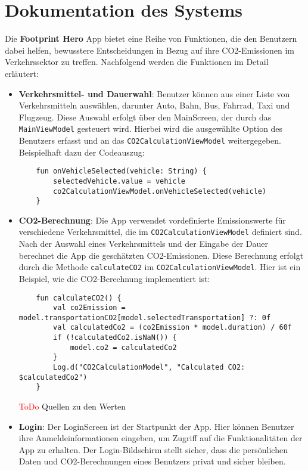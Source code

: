 \documentclass{article}
\begin{document}
\section{Dokumentation des Systems}
Die \textbf{Footprint Hero} App bietet eine Reihe von Funktionen, die den Benutzern dabei helfen, bewusstere Entscheidungen in Bezug auf ihre CO2-Emissionen im Verkehrssektor zu treffen. Nachfolgend werden die Funktionen im Detail erläutert:

\begin{itemize}
    \item \textbf{Verkehrsmittel- und Dauerwahl}:
    Benutzer können aus einer Liste von Verkehrsmitteln auswählen, darunter Auto, Bahn, Bus, Fahrrad, Taxi und Flugzeug. Diese Auswahl erfolgt über den MainScreen, der durch das \texttt{MainViewModel} gesteuert wird. Hierbei wird die ausgewählte Option des Benutzers erfasst und an das \texttt{CO2CalculationViewModel} weitergegeben. Beispielhaft dazu der Codeauszug:
    
    \begin{lstlisting}
    fun onVehicleSelected(vehicle: String) {
        selectedVehicle.value = vehicle
        co2CalculationViewModel.onVehicleSelected(vehicle)
    }
    \end{lstlisting}

    \item \textbf{CO2-Berechnung}:
    Die App verwendet vordefinierte Emissionswerte für verschiedene Verkehrsmittel, die im \texttt{CO2CalculationViewModel} definiert sind. Nach der Auswahl eines Verkehrsmittels und der Eingabe der Dauer berechnet die App die geschätzten CO2-Emissionen. Diese Berechnung erfolgt durch die Methode \texttt{calculateCO2} im \texttt{CO2CalculationViewModel}. Hier ist ein Beispiel, wie die CO2-Berechnung implementiert ist:
    
    \begin{lstlisting}
    fun calculateCO2() {
        val co2Emission = model.transportationCO2[model.selectedTransportation] ?: 0f
        val calculatedCo2 = (co2Emission * model.duration) / 60f
        if (!calculatedCo2.isNaN()) {
            model.co2 = calculatedCo2
        }
        Log.d("CO2CalculationModel", "Calculated CO2: $calculatedCo2")
    }
    \end{lstlisting}
    \textcolor{red}{ToDo} Quellen zu den Werten

    
            \item \textbf{Login}: Der LoginScreen ist der Startpunkt der App. Hier können Benutzer ihre Anmeldeinformationen eingeben, um Zugriff auf die Funktionalitäten der App zu erhalten. Der Login-Bildschirm stellt sicher, dass die persönlichen Daten und CO2-Berechnungen eines Benutzers privat und sicher bleiben.


\end{itemize}
\end{document}

